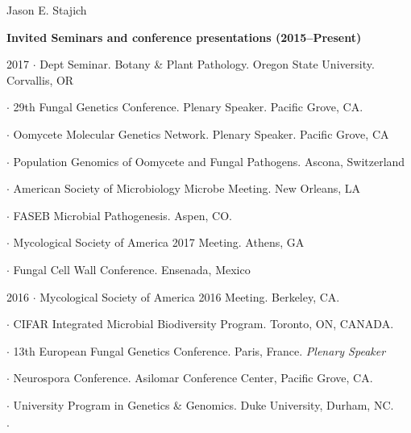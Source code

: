 \documentclass[10pt]{article}
\begin{document}
\begin{cv}{\centerline{Jason E. Stajich}}
\setlength{\cvlabelwidth}{8mm}
\begin{cvlistcompact}{\bf Invited Seminars and conference presentations (2015--Present)}
\item [2017] $\cdot$ Dept Seminar. Botany \& Plant Pathology. Oregon State
  University. Corvallis, OR
\item $\cdot$
  29th Fungal Genetics Conference. Plenary Speaker. Pacific Grove,
  CA.
\item $\cdot$ Oomycete Molecular Genetics Network. Plenary
     Speaker. Pacific Grove, CA
\item $\cdot$ Population Genomics of Oomycete and Fungal
  Pathogens. Ascona, Switzerland
\item $\cdot$ American Society of Microbiology Microbe Meeting. New
  Orleans, LA
\item $\cdot$ FASEB Microbial Pathogenesis. Aspen, CO.
\item $\cdot$ Mycological Society of America 2017 Meeting. Athens, GA
\item $\cdot$ Fungal Cell Wall Conference. Ensenada, Mexico
\item [2016] $\cdot$
  Mycological Society of America 2016 Meeting. Berkeley, CA. 
\item $\cdot$
    CIFAR Integrated Microbial Biodiversity Program. Toronto, ON, CANADA.
  \item $\cdot$   %
    13th European Fungal Genetics Conference.
    Paris, France.  {\it Plenary Speaker}
  \item $\cdot$ %
    Neurospora Conference. Asilomar Conference Center, Pacific
    Grove, CA.
  \item $\cdot$ %
    University Program in Genetics \& Genomics. Duke University, Durham, NC. 
  \item $\cdot$ %

\end{cvlistcompact}
\end{cv}
\end{document}
